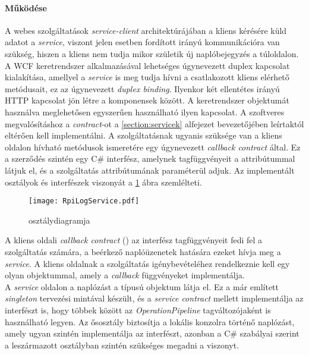 \paragraph{Működése} A webes szolgáltatások \emph{service-client} architektúrájában a kliens kérésére küld adatot a \emph{service}, viszont jelen esetben fordított irányú kommunikációra van szükség, hiszen a kliens nem tudja mikor születik új naplóbejegyzés a túloldalon. A WCF keretrendszer alkalmazásával lehetséges úgynevezett duplex kapcsolat kialakítása, amellyel a \emph{service} is meg tudja hívni a csatlakozott kliens elérhető metódusait, ez az úgynevezett \emph{duplex binding}. Ilyenkor két ellentétes irányú HTTP kapcsolat jön létre a komponensek között. A keretrendszer  objektumát használva meglehetősen egyszerűen használható ilyen kapcsolat. A szoftveres megvalósításhoz a \emph{contract}-ot a \ref{section:servicek} alfejezet bevezetőjében leírtaktól eltérően kell implementálni. A szolgáltatásnak ugyanis szüksége van a kliens oldalon hívható metódusok ismeretére egy úgynevezett \emph{callback contract} által. Ez a szerződés szintén egy C\# interfész, amelynek tagfüggvényeit a \code{[ServiceMethod]} attribútummal látjuk el, és a szolgáltatás \code{[OperationContract]} attribútumának paraméterül adjuk. Az implementált osztályok és interfészek viszonyát a \ref{fig:RpiLogService_class} ábra szemlélteti.\\

\begin{figure}[h]
\vspace{.5cm}
\texttt{[image: RpiLogService.pdf]}
\centering
\vspace{.2cm}
\caption{ osztálydiagramja}
\vspace{.5cm}
\label{fig:RpiLogService_class}
\end{figure}

A kliens oldali \emph{callback contract} () az  interfész tagfüggvényeit fedi fel a szolgáltatás számára, a beérkező naplóüzenetek hatására ezeket hívja meg a \emph{service}. A kliens oldalnak a szolgáltatás igénybevételéhez rendelkeznie kell egy olyan objektummal, amely a \emph{callback} függvényeket implementálja.\\
A \emph{service} oldalon a naplózást a  típusú objektum látja el. Ez a már említett \emph{singleton} tervezési mintával készült, és a \emph{service contract} mellett implementálja az  interfészt is, hogy többek között az \emph{OperationPipeline} tagváltozójaként is használható legyen. Az ősosztály biztosítja a lokális konzolra történő naplózást, amely ugyan szintén implementálja az  interfészt, azonban a C\# szabályai szerint a leszármazott osztályban szintén szükséges megadni a viszonyt. \cite{cs-in-a-nutshell}

